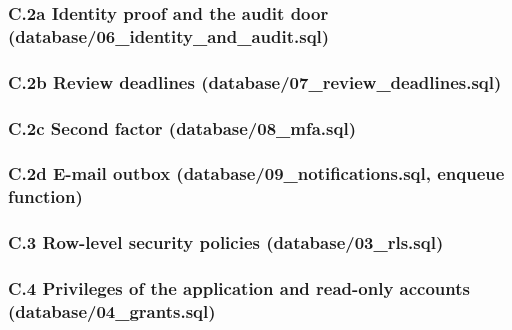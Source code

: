 \documentclass[10pt,a4paper]{article}
\begin{document}
\subsubsection*{C.2a Identity proof and the audit door (database/06\_identity\_and\_audit.sql)}

\subsubsection*{C.2b Review deadlines (database/07\_review\_deadlines.sql)}

\subsubsection*{C.2c Second factor (database/08\_mfa.sql)}

\subsubsection*{C.2d E-mail outbox (database/09\_notifications.sql, enqueue function)}

\subsubsection*{C.3 Row-level security policies (database/03\_rls.sql)}

\subsubsection*{C.4 Privileges of the application and read-only accounts (database/04\_grants.sql)}

\end{document}
